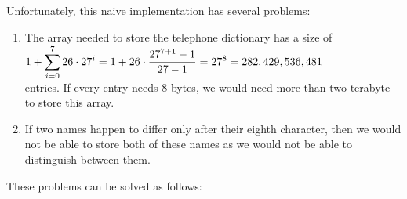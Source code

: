\noindent
Unfortunately, this naive implementation has several problems: 
\begin{enumerate}
\item The array needed to store the telephone dictionary has a size of 
      \\[0.2cm]
      \hspace*{1.3cm}
      $\displaystyle 1 + \sum\limits_{i=0}^7 26 \cdot 27^i = 1 + 26 \cdot \frac{27^{7+1} - 1}{27 - 1} = 27^8 = 282,429,536,481$ 
      \\[0.2cm]
      entries.  If every entry needs 8 bytes, we would need more than two terabyte to store this array.
\item If two names happen to differ only after their eighth character, then we would not be able to
      store both of these names as we would not be able to distinguish between them.
\end{enumerate}
These problems can be solved as follows:
